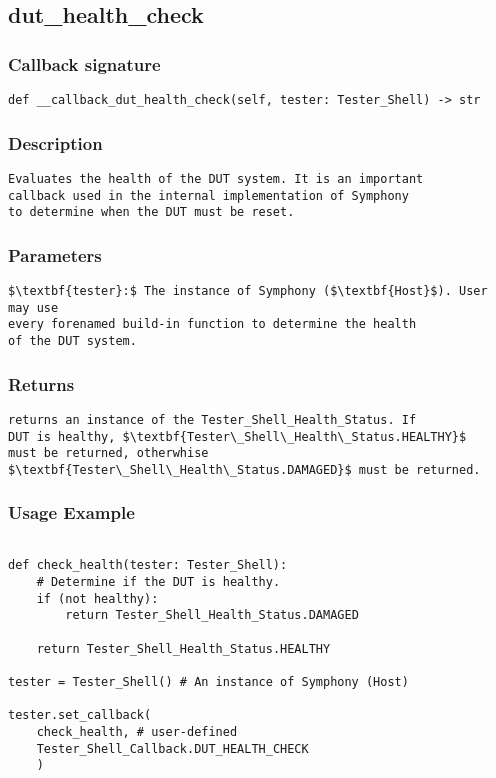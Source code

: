 \subsection{dut\_health\_check}

\subsubsection{Callback signature}
\begin{lstlisting}
def __callback_dut_health_check(self, tester: Tester_Shell) -> str
\end{lstlisting}

\subsubsection{Description}
\begin{lstlisting}[mathescape=true, keywordstyle=\color{black}, showstringspaces=false]
Evaluates the health of the DUT system. It is an important 
callback used in the internal implementation of Symphony 
to determine when the DUT must be reset.
\end{lstlisting}

\subsubsection{Parameters}
\begin{lstlisting}[mathescape=true, keywordstyle=\color{black}]
$\textbf{tester}:$ The instance of Symphony ($\textbf{Host}$). User may use 
every forenamed build-in function to determine the health 
of the DUT system.
\end{lstlisting}

\subsubsection{Returns}
\begin{lstlisting}[mathescape=true, keywordstyle=\color{black}]
returns an instance of the Tester_Shell_Health_Status. If 
DUT is healthy, $\textbf{Tester\_Shell\_Health\_Status.HEALTHY}$ 
must be returned, otherwhise 
$\textbf{Tester\_Shell\_Health\_Status.DAMAGED}$ must be returned.
\end{lstlisting}


\subsubsection{Usage Example}
\begin{lstlisting}

def check_health(tester: Tester_Shell):
    # Determine if the DUT is healthy.
    if (not healthy):
        return Tester_Shell_Health_Status.DAMAGED

    return Tester_Shell_Health_Status.HEALTHY

tester = Tester_Shell() # An instance of Symphony (Host)

tester.set_callback(
    check_health, # user-defined
    Tester_Shell_Callback.DUT_HEALTH_CHECK
    )
\end{lstlisting}
